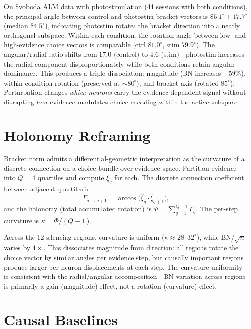 \documentclass[9pt,lineno]{elife}
\begin{document}
On Svoboda ALM data with photostimulation \citep{dandi000007, dandi000009} (44 sessions with both conditions), the principal angle between control and photostim bracket vectors is $85.1^\circ \pm 17.7^\circ$ (median $84.5^\circ$), indicating photostim rotates the bracket direction into a nearly orthogonal subspace. Within each condition, the rotation angle between low- and high-evidence choice vectors is comparable (ctrl $81.0^\circ$, stim $79.9^\circ$). The angular/radial ratio shifts from $17.0$ (control) to $4.6$ (stim)---photostim increases the radial component disproportionately while both conditions retain angular dominance. This produces a triple dissociation: magnitude (BN increases $+59\%$), within-condition rotation (preserved at ${\sim}80^\circ$), and bracket axis (rotated $85^\circ$). Perturbation changes \emph{which neurons} carry the evidence-dependent signal without disrupting \emph{how} evidence modulates choice encoding within the active subspace.

\section{Holonomy Reframing}
\label{app:holonomy}

Bracket norm admits a differential-geometric interpretation as the curvature of a discrete connection on a choice bundle over evidence space. Partition evidence into $Q = 4$ quartiles and compute $\xi_q$ for each. The discrete connection coefficient between adjacent quartiles is
\[
\Gamma_{q \to q+1} = \arccos\!\bigl(\hat{\xi}_q \cdot \hat{\xi}_{q+1}\bigr),
\]
and the holonomy (total accumulated rotation) is $\Phi = \sum_{q=1}^{Q-1} \Gamma_q$. The per-step curvature is $\kappa = \Phi / (Q - 1)$.

Across the 12 silencing regions, curvature is uniform ($\kappa \approx 28$--$32^\circ$), while BN/\!$\sqrt{n}$ varies by $4\times$. This dissociates magnitude from direction: all regions rotate the choice vector by similar angles per evidence step, but causally important regions produce larger per-neuron displacements at each step. The curvature uniformity is consistent with the radial/angular decomposition---BN variation across regions is primarily a gain (magnitude) effect, not a rotation (curvature) effect.

\section{Causal Baselines}
\label{app:causal_baselines}
\end{document}
